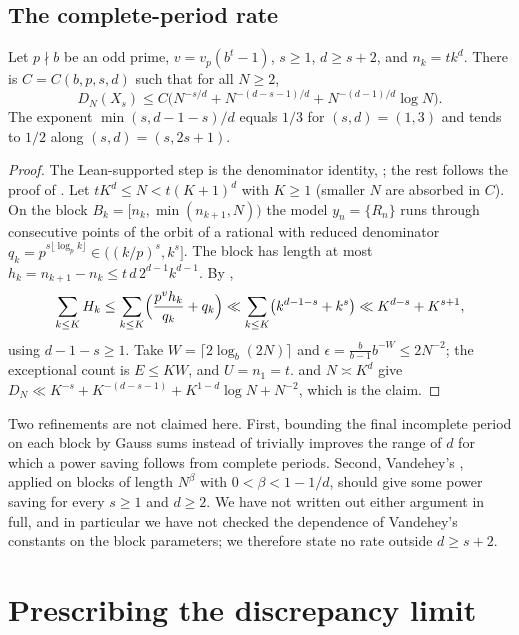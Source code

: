 \documentclass[11pt]{article}
\newcommand{\fr}[1]{\{#1\}}
\begin{document}
\subsection{The complete-period rate}

\begin{theorem}\label{thm:rate}
Let $p\nmid b$ be an odd prime, $v=v_p(b^t-1)$, $s\ge1$, $d\ge s+2$, and $n_k=tk^d$. There is
$C=C(b,p,s,d)$ such that for all $N\ge2$,
\[
D_N(X_s)\le C\bigl(N^{-s/d}+N^{-(d-s-1)/d}+N^{-(d-1)/d}\log N\bigr).
\]
The exponent $\min(s,d-1-s)/d$ equals $1/3$ for $(s,d)=(1,3)$ and tends to $1/2$ along
$(s,d)=(s,2s+1)$.
\end{theorem}

\begin{proof}
The Lean-supported step is the denominator identity, ; the rest follows the proof of
. Let $tK^d\le N<t(K+1)^d$ with $K\ge1$ (smaller $N$ are absorbed in $C$). On the
block $B_k=[n_k,\min(n_{k+1},N))$ the model $y_n=\fr{R_n}$ runs through consecutive points of
the orbit of a rational with reduced denominator $q_k=p^{s\lfloor\log_pk\rfloor}\in((k/p)^s,k^s]$.
The block has length at most $h_k=n_{k+1}-n_k\le t\,d\,2^{d-1}k^{d-1}$. By
,
\[
\sum_{k\le K}H_k\le\sum_{k\le K}\Bigl(\frac{p^vh_k}{q_k}+q_k\Bigr)
\ll\sum_{k\le K}\bigl(k^{d-1-s}+k^s\bigr)\ll K^{d-s}+K^{s+1},
\]
using $d-1-s\ge1$. Take $W=\lceil2\log_b(2N)\rceil$ and $\epsilon=\frac b{b-1}b^{-W}\le2N^{-2}$; the
exceptional count is $E\le KW$, and $U=n_1=t$.  and $N\asymp K^d$ give
$D_N\ll K^{-s}+K^{-(d-s-1)}+K^{1-d}\log N+N^{-2}$, which is the claim.
\end{proof}

\begin{remark}
Two refinements are not claimed here. First, bounding the final incomplete period on each block by
Gauss sums instead of trivially improves the range of $d$ for which a power saving follows from
complete periods. Second, Vandehey's \cite[Corollary~1.2]{Vandehey19}, applied on blocks of length
$N^\beta$ with $0<\beta<1-1/d$, should give some power saving for every $s\ge1$ and $d\ge2$. We have
not written out either argument in full, and in particular we have not checked the dependence of
Vandehey's constants on the block parameters; we therefore state no rate outside
$d\ge s+2$.
\end{remark}

\section{Prescribing the discrepancy limit}\label{sec:program}
\end{document}
